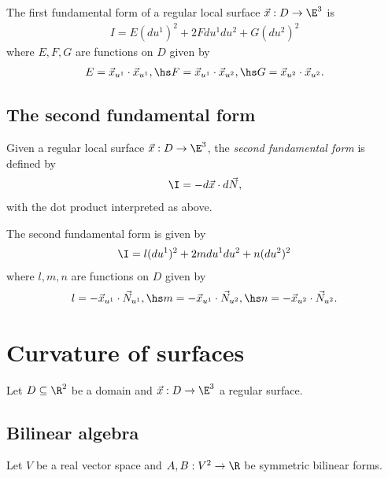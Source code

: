 \documentclass{article}
\begin{document}
\begin{proposition}[Notes 7.10]
	The first fundamental form of a regular local surface $\vec x:D\to\E^3$ is
	\begin{align*}
		I = E(du^1)^2 + 2Fdu^1du^2+ G(du^2)^2
	\end{align*}
	where $E,F,G$ are functions on $D$ given by
	\begin{align}
		\label{fff}
		E=\vec x_{u^1} \cdot \vec x_{u^1},\hs
		F=\vec x_{u^1} \cdot \vec x_{u^2},\hs
		G=\vec x_{u^2} \cdot \vec x_{u^2}.
	\end{align}
\end{proposition}

\subsection{The second fundamental form}


\begin{definition}
	Given a regular local surface $\vec x: D\to\E^3$, the \emph{second fundamental form}
	is defined by
	\begin{align*}
		\I = -d\vec x\cdot d\vec N,
	\end{align*}
	with the dot product interpreted as above.
\end{definition}

\begin{proposition}[Notes 7.17]
	The second fundamental form is given by
	\begin{align*}
		\I = l(du^1)^2 + 2mdu^1du^2+n(du^2)^2
	\end{align*}
	where $l,m,n$ are functions on $D$ given by
	\begin{align}
		\label{sff}
		l=-\vec x_{u^1}\cdot\vec N_{u^1}, \hs
		m=-\vec x_{u^1}\cdot\vec N_{u^2}, \hs
		n=-\vec x_{u^2}\cdot\vec N_{u^2}.
	\end{align}
\end{proposition}

\section{Curvature of surfaces}

Let $D\subseteq\R^2$ be a domain and $\vec x:D\to\E^3$ a regular surface.

\subsection{Bilinear algebra}

Let $V$ be a real vector space and $A,B:V^2\to\R$ be symmetric bilinear forms.
\end{document}
